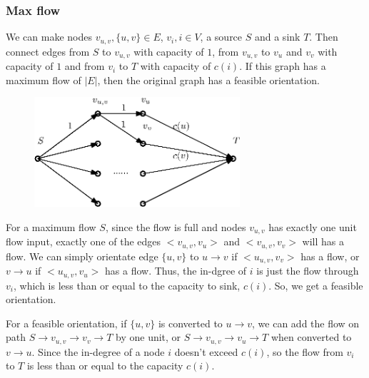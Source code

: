 		\subsubsection*{Max flow}
			We can make nodes $v_{u,v},\{u,v\}\in E$, $v_i,i\in V$, a source $S$ and a sink $T$. Then connect edges from $S$ to $v_{u,v}$ with capacity of $1$, from $v_{u,v}$ to $v_u$ and $v_v$ with capacity of $1$ and from $v_i$ to $T$ with capacity of $c(i)$. If this graph has a maximum flow of $|E|$, then the original graph has a feasible orientation.\par
			\begin{figure}[H]
				\centering\includegraphics[width=3in]{source/qwd/qa.eps}
			\end{figure}
			For a maximum flow $S$, since the flow is full and nodes $v_{u,v}$ has exactly one unit flow input, exactly one of the edges $<v_{u,v}, v_u>$ and $<v_{u,v}, v_v>$ will has a flow. We can simply orientate edge $\{u,v\}$ to $u\to v$ if $<u_{u,v}, v_v>$ has a flow, or $v\to u$ if $<u_{u,v}, v_u>$ has a flow. Thus, the in-dgree of $i$ is just the flow through $v_i$, which is less than or equal to the capacity to sink, $c(i)$. So, we get a feasible orientation.\par
			For a feasible orientation, %
			if $\{u, v\}$ is converted to $u\to v$, we can add the flow on path $S\to v_{u, v}\to v_v\to T$ by one unit, or $S\to v_{u, v}\to v_u\to T$ when converted to $v\to u$. Since the in-degree of a node $i$ doesn't exceed $c(i)$, so the flow from $v_i$ to $T$ is less than or equal to the capacity $c(i)$.
